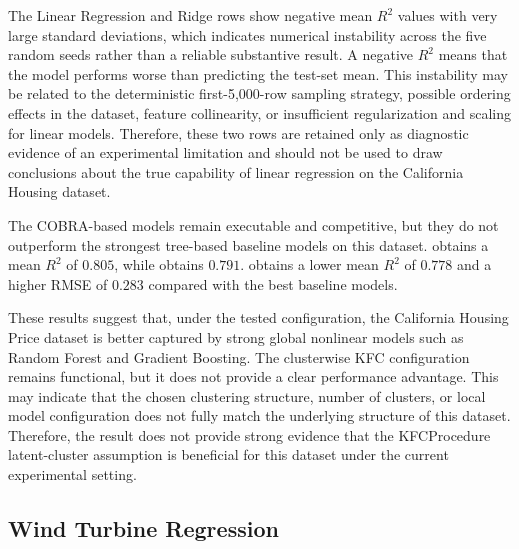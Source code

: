 The Linear Regression and Ridge rows show negative mean $R^2$ values with very large standard deviations, which indicates numerical instability across the five random seeds rather than a reliable substantive result. A negative $R^2$ means that the model performs worse than predicting the test-set mean. This instability may be related to the deterministic first-5,000-row sampling strategy, possible ordering effects in the dataset, feature collinearity, or insufficient regularization and scaling for linear models. Therefore, these two rows are retained only as diagnostic evidence of an experimental limitation and should not be used to draw conclusions about the true capability of linear regression on the California Housing dataset.

The COBRA-based models remain executable and competitive, but they do not outperform the strongest tree-based baseline models on this dataset.  obtains a mean $R^2$ of $0.805$, while  obtains $0.791$.  obtains a lower mean $R^2$ of $0.778$ and a higher RMSE of $0.283$ compared with the best baseline models.

These results suggest that, under the tested configuration, the California Housing Price dataset is better captured by strong global nonlinear models such as Random Forest and Gradient Boosting. The clusterwise KFC configuration remains functional, but it does not provide a clear performance advantage. This may indicate that the chosen clustering structure, number of clusters, or local model configuration does not fully match the underlying structure of this dataset. Therefore, the result does not provide strong evidence that the KFCProcedure latent-cluster assumption is beneficial for this dataset under the current experimental setting.

\subsection{Wind Turbine Regression}

